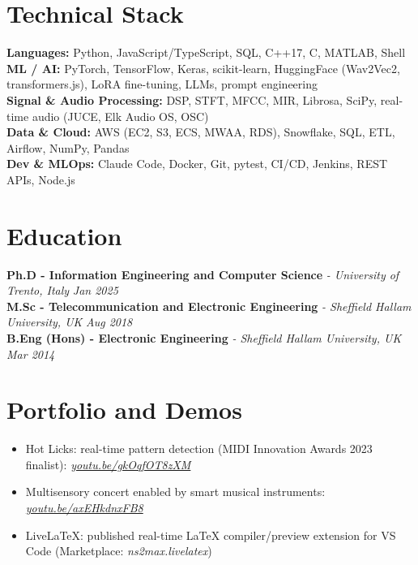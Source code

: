 \documentclass[11pt]{article}
\begin{document}
\section*{Technical Stack}
\textbf{Languages:} Python, JavaScript/TypeScript, SQL, C++17, C, MATLAB, Shell\\
\textbf{ML / AI:} PyTorch, TensorFlow, Keras, scikit-learn, HuggingFace (Wav2Vec2, transformers.js), LoRA fine-tuning, LLMs, prompt engineering\\
\textbf{Signal \& Audio Processing:} DSP, STFT, MFCC, MIR, Librosa, SciPy, real-time audio (JUCE, Elk Audio OS, OSC)\\
\textbf{Data \& Cloud:} AWS (EC2, S3, ECS, MWAA, RDS), Snowflake, SQL, ETL, Airflow, NumPy, Pandas\\
\textbf{Dev \& MLOps:} Claude Code, Docker, Git, pytest, CI/CD, Jenkins, REST APIs, Node.js

\section*{Education}
\textbf{Ph.D - Information Engineering and Computer Science} \textit{\small{ - University of Trento, Italy}} \hfill \textit{Jan 2025}\\[2pt]
\noindent\textbf{M.Sc - Telecommunication and Electronic Engineering} \textit{\small{ - Sheffield Hallam University, UK}} \hfill \textit{Aug 2018}\\[2pt]
\noindent\textbf{B.Eng (Hons) - Electronic Engineering} \textit{\small{ - Sheffield Hallam University, UK}} \hfill \textit{Mar 2014}

\section*{Portfolio and Demos \footnotesize {}}
\begin{itemize}[leftmargin=1.2em, itemsep=-0.25em]
    \item Hot Licks: real-time pattern detection (MIDI Innovation Awards 2023 finalist): \href{https://youtu.be/gkOqfOT8zXM}{\textit{youtu.be/gkOqfOT8zXM}}
    \item Multisensory concert enabled by smart musical instruments: \href{https://youtu.be/axEHkdnxFB8}{\textit{youtu.be/axEHkdnxFB8}}
    \item LiveLaTeX: published real-time LaTeX compiler/preview extension for VS Code (Marketplace: \textit{ns2max.livelatex})
\end{itemize}
\end{document}
